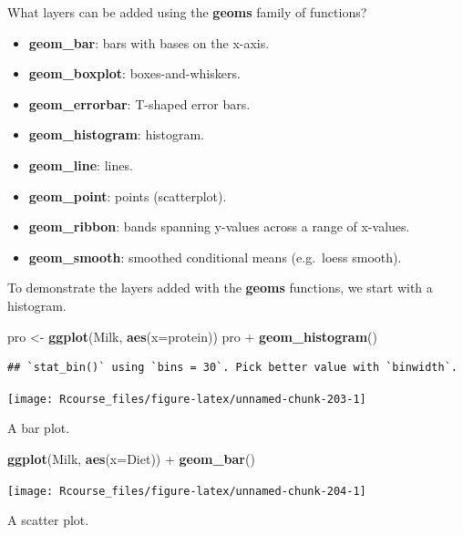 \documentclass[]{book}
\newenvironment{Shaded}{\begin{snugshade}}{\end{snugshade}}
\newcommand{\KeywordTok}[1]{\textcolor[rgb]{0.13,0.29,0.53}{\textbf{{#1}}}}
\newcommand{\DataTypeTok}[1]{\textcolor[rgb]{0.13,0.29,0.53}{{#1}}}
\newcommand{\StringTok}[1]{\textcolor[rgb]{0.31,0.60,0.02}{{#1}}}
\newcommand{\NormalTok}[1]{{#1}}
\providecommand{\tightlist}{%
  \setlength{\itemsep}{0pt}\setlength{\parskip}{0pt}}
\theoremstyle{definition}
\theoremstyle{definition}
\theoremstyle{remark}
\begin{document}
What layers can be added using the \textbf{geoms} family of functions?

\begin{itemize}
\tightlist
\item
  \textbf{geom\_bar}: bars with bases on the x-axis.
\item
  \textbf{geom\_boxplot}: boxes-and-whiskers.
\item
  \textbf{geom\_errorbar}: T-shaped error bars.
\item
  \textbf{geom\_histogram}: histogram.
\item
  \textbf{geom\_line}: lines.
\item
  \textbf{geom\_point}: points (scatterplot).
\item
  \textbf{geom\_ribbon}: bands spanning y-values across a range of
  x-values.
\item
  \textbf{geom\_smooth}: smoothed conditional means (e.g.~loess smooth).
\end{itemize}

To demonstrate the layers added with the \textbf{geoms} functions, we
start with a histogram.

\begin{Shaded}
\begin{Highlighting}[]
\NormalTok{pro <-}\StringTok{ }\KeywordTok{ggplot}\NormalTok{(Milk, }\KeywordTok{aes}\NormalTok{(}\DataTypeTok{x=}\NormalTok{protein))}
\NormalTok{pro +}\StringTok{ }\KeywordTok{geom_histogram}\NormalTok{()}
\end{Highlighting}
\end{Shaded}

\begin{verbatim}
## `stat_bin()` using `bins = 30`. Pick better value with `binwidth`.
\end{verbatim}

\texttt{[image: Rcourse\_files/figure-latex/unnamed-chunk-203-1]}

A bar plot.

\begin{Shaded}
\begin{Highlighting}[]
\KeywordTok{ggplot}\NormalTok{(Milk, }\KeywordTok{aes}\NormalTok{(}\DataTypeTok{x=}\NormalTok{Diet)) +}
\StringTok{  }\KeywordTok{geom_bar}\NormalTok{()}
\end{Highlighting}
\end{Shaded}

\texttt{[image: Rcourse\_files/figure-latex/unnamed-chunk-204-1]}

A scatter plot.
\end{document}
